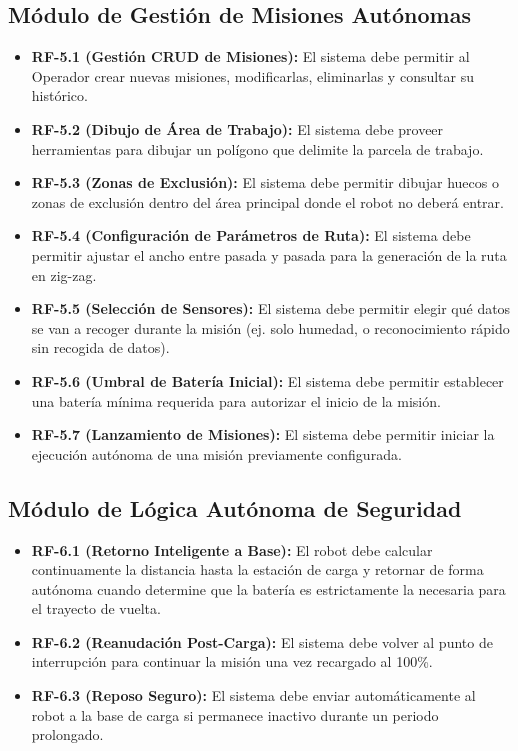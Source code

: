 \subsection{Módulo de Gestión de Misiones Autónomas}
\begin{itemize}
    \item \textbf{RF-5.1 (Gestión CRUD de Misiones):} El sistema debe permitir al Operador crear nuevas misiones, modificarlas, eliminarlas y consultar su histórico.
    \item \textbf{RF-5.2 (Dibujo de Área de Trabajo):} El sistema debe proveer herramientas para dibujar un polígono que delimite la parcela de trabajo.
    \item \textbf{RF-5.3 (Zonas de Exclusión):} El sistema debe permitir dibujar huecos o zonas de exclusión dentro del área principal donde el robot no deberá entrar.
    \item \textbf{RF-5.4 (Configuración de Parámetros de Ruta):} El sistema debe permitir ajustar el ancho entre pasada y pasada para la generación de la ruta en zig-zag.
    \item \textbf{RF-5.5 (Selección de Sensores):} El sistema debe permitir elegir qué datos se van a recoger durante la misión (ej. solo humedad, o reconocimiento rápido sin recogida de datos).
    \item \textbf{RF-5.6 (Umbral de Batería Inicial):} El sistema debe permitir establecer una batería mínima requerida para autorizar el inicio de la misión.
    \item \textbf{RF-5.7 (Lanzamiento de Misiones):} El sistema debe permitir iniciar la ejecución autónoma de una misión previamente configurada.
\end{itemize}

\subsection{Módulo de Lógica Autónoma de Seguridad}
\begin{itemize}
    \item \textbf{RF-6.1 (Retorno Inteligente a Base):} El robot debe calcular continuamente la distancia hasta la estación de carga y retornar de forma autónoma cuando determine que la batería es estrictamente la necesaria para el trayecto de vuelta.
    \item \textbf{RF-6.2 (Reanudación Post-Carga):} El sistema debe volver al punto de interrupción para continuar la misión una vez recargado al 100\%.
    \item \textbf{RF-6.3 (Reposo Seguro):} El sistema debe enviar automáticamente al robot a la base de carga si permanece inactivo durante un periodo prolongado.
\end{itemize}

